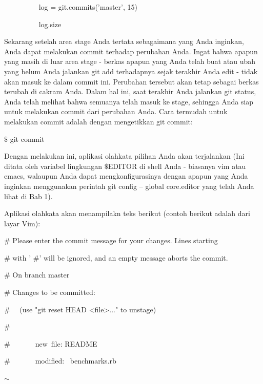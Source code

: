 \noindent 
~~~~~~~~~ log = git.commits('master', 15) \par
\noindent 
~~~~~~~~~ log.size \par
\vspace{12pt}
\vspace{12pt}
\noindent 
Sekarang setelah area stage Anda tertata sebagaimana yang Anda inginkan, Anda dapat melakukan commit terhadap perubahan Anda. Ingat bahwa apapun yang masih di luar area stage - berkas apapun yang Anda telah buat atau ubah yang belum Anda jalankan git add terhadapnya sejak terakhir Anda edit - tidak akan masuk ke dalam commit ini. Perubahan tersebut akan tetap sebagai berkas terubah di cakram Anda. Dalam hal ini, saat terakhir Anda jalankan git status, Anda telah melihat bahwa semuanya telah masuk ke stage, sehingga Anda siap untuk melakukan commit dari perubahan Anda. Cara termudah untuk melakukan commit adalah dengan mengetikkan git commit: \par
\vspace{12pt}
\noindent 
 $  \$  $ git commit \par
\noindent 
Dengan melakukan ini, aplikasi olahkata pilihan Anda akan terjalankan (Ini ditata oleh variabel lingkungan  $  \$  $EDITOR di shell Anda - biasanya vim atau emacs, walaupun Anda dapat mengkonfigurasinya dengan apapun yang Anda inginkan menggunakan perintah git config -- global core.editor yang telah Anda lihat di Bab 1). \par
\noindent 
Aplikasi olahkata akan menampilakn teks berikut (contoh berikut adalah dari layar Vim): \par
\vspace{12pt}
\vspace{12pt}
\noindent 
 $  \#  $ Please enter the commit message for your changes. Lines starting \par
\noindent 
 $  \#  $ with ' $  \#  $' will be ignored, and an empty message aborts the commit. \par
\noindent 
 $  \#  $ On branch master \par
\noindent 
 $  \#  $ Changes to be committed: \par
\noindent 
 $  \#  $~~ (use "git reset HEAD <file>..." to unstage) \par
\noindent 
 $  \#  $ \par
\noindent 
 $  \#  $~~~~~~~new~file:   README \par
\noindent 
 $  \#  $~~~~~~~modified:~  benchmarks.rb  \par
\noindent 
 $  \sim  $ \par
